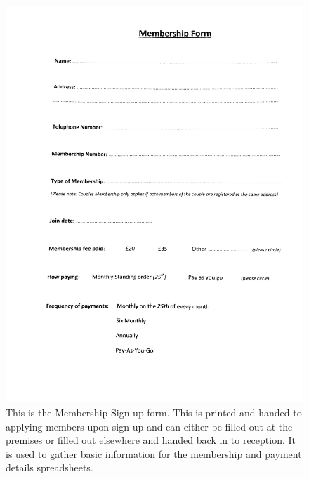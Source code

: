 \begin{figure}[H]
    \includegraphics[width=\textwidth]{MembershipForm.jpg}
    \caption{This is the Membership Sign up form. This is printed and handed to applying members upon sign up and can either be filled out at the premises or filled out elsewhere and handed back in to reception. It is used to gather basic information for the membership and payment details spreadsheets.} \label{fig:Membership Sign up Form}
\end{figure}

